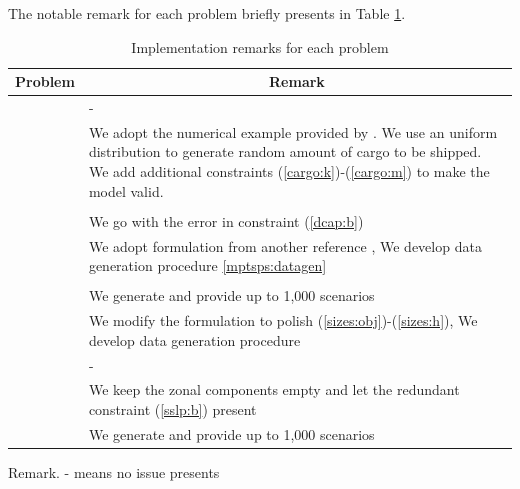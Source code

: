 The notable remark for each problem briefly presents in Table \ref{table:remarks}.
\begin{table}[H]
	\centering
		\begin{threeparttable}
			\caption{Implementation remarks for each problem}
			\label{table:remarks}
			\begin{tabular}{@{}lp{3in}}
				\toprule
				Problem & \multicolumn{1}{c}{Remark}                                                \\ \midrule
				\airlift & -\\
				\cargo & We adopt the numerical example provided by \cite{journal:AF2004}. We use an uniform distribution to generate random amount of cargo to be shipped. We add additional constraints (\ref{cargo:k})-(\ref{cargo:m}) to make the model valid.\\
				\chem & \\
				\dcap   & We go with the error in constraint (\ref{dcap:b})                                              \\
				\mptsps & We adopt formulation from another reference \cite{journal:LSD1990}, We develop data generation procedure \ref{mptsps:datagen} \\
				\phone & \\
				\sdcp & We generate and provide up to 1,000 scenarios\\
				\sizes  &  We modify the formulation to polish (\ref{sizes:obj})-(\ref{sizes:h}), We develop data generation procedure                                                 \\
				\smkp   & -                                                                         \\
				\sslp   & We keep the zonal components empty and let the redundant constraint (\ref{sslp:b}) present                                     \\
				\suc    & We generate and provide up to 1,000 scenarios                              \\ \bottomrule
			\end{tabular}
			\begin{tablenotes}
				\small
				\item Remark. - means no issue presents
			\end{tablenotes}
		\end{threeparttable}
\end{table}


